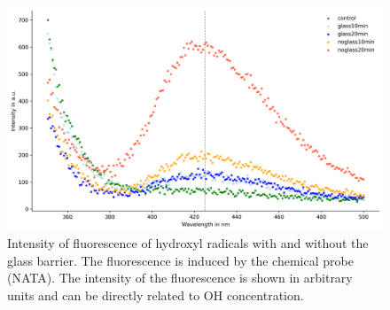 \begin{figure}
    \centering
    \includegraphics[width=.8\textwidth]{images/OH_concentration.png}
    \caption[Intensity of Fluorescence of Hydroxyl Radicals via Chemical Probe Method]{Intensity of fluorescence of hydroxyl radicals with and without the glass barrier. The fluorescence is induced by the chemical probe (NATA). The intensity of the fluorescence is shown in arbitrary units and can be directly related to OH concentration.}
    \label{fig:oh}
\end{figure}